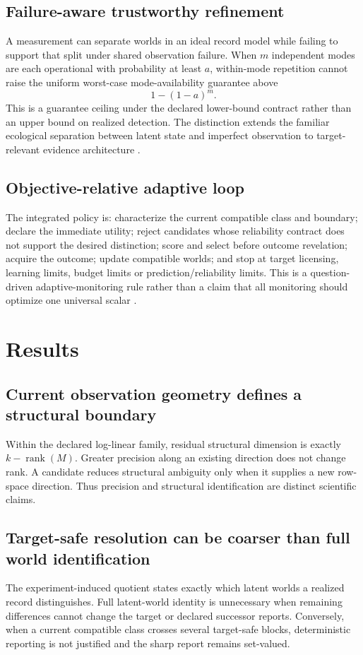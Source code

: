 \documentclass[11pt]{article}
\begin{document}
\subsection{Failure-aware trustworthy refinement}
A measurement can separate worlds in an ideal record model while failing to support that split under shared observation failure. When $m$ independent modes are each operational with probability at least $a$, within-mode repetition cannot raise the uniform worst-case mode-availability guarantee above
\[
1-(1-a)^m.
\]
This is a guarantee ceiling under the declared lower-bound contract rather than an upper bound on realized detection. The distinction extends the familiar ecological separation between latent state and imperfect observation to target-relevant evidence architecture \cite{MacKenzieEtAl2002,RoyleLink2006}.

\subsection{Objective-relative adaptive loop}
The integrated policy is: characterize the current compatible class and boundary; declare the immediate utility; reject candidates whose reliability contract does not support the desired distinction; score and select before outcome revelation; acquire the outcome; update compatible worlds; and stop at target licensing, learning limits, budget limits or prediction/reliability limits. This is a question-driven adaptive-monitoring rule rather than a claim that all monitoring should optimize one universal scalar \cite{NicholsWilliams2006,LindenmayerLikens2009,DietzeEtAl2018}.

\section{Results}
\subsection{Current observation geometry defines a structural boundary}
Within the declared log-linear family, residual structural dimension is exactly $k-\operatorname{rank}(M)$. Greater precision along an existing direction does not change rank. A candidate reduces structural ambiguity only when it supplies a new row-space direction. Thus precision and structural identification are distinct scientific claims.

\subsection{Target-safe resolution can be coarser than full world identification}
The experiment-induced quotient states exactly which latent worlds a realized record distinguishes. Full latent-world identity is unnecessary when remaining differences cannot change the target or declared successor reports. Conversely, when a current compatible class crosses several target-safe blocks, deterministic reporting is not justified and the sharp report remains set-valued.
\end{document}
